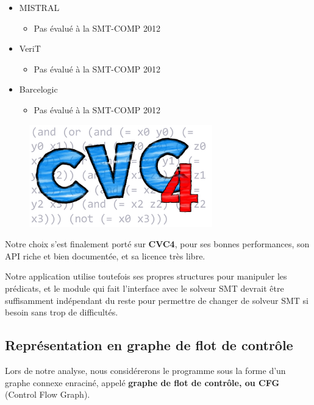 \documentclass[french]{article}
\newcommand\ccc[1]{\color{red}{#1}\color{black}}
\begin{document}
\begin{itemize}
\begin{itemize}
    \end{itemize}
    \item MISTRAL~\cite{smt_mistral}
    \begin{itemize}
      \item Pas évalué à la SMT-COMP 2012
    \end{itemize}
    \item VeriT~\cite{smt_verit}
    \begin{itemize}
      \item Pas évalué à la SMT-COMP 2012
    \end{itemize}
    \item Barcelogic~\cite{smt_barcelogic}
    \begin{itemize}
      \item Pas évalué à la SMT-COMP 2012
    \end{itemize}
  \end{itemize}

  \begin{figure}
    \centering
    \includegraphics{./pictures/cvc4.png}
    \label{cvc4}
  \end{figure}

  Notre choix s'est finalement porté sur \textbf{CVC4}, pour ses bonnes performances, son API riche et bien documentée, et sa licence très libre.

  Notre application utilise toutefois ses propres structures pour manipuler les prédicats, et le module qui fait l'interface avec le solveur SMT devrait être suffisamment indépendant du reste pour permettre de changer de solveur SMT si besoin sans trop de difficultés.

  \subsection{Représentation en graphe de flot de contrôle}
  Lors de notre analyse, nous considérerons le programme sous la forme d'un graphe connexe enraciné, appelé \textbf{graphe de flot de contrôle, ou CFG} (Control Flow Graph). \ccc{Dans le cas des programmes sans boucles que nous traitons, il s'agit aussi d'un graphe acyclique.}
\end{document}
